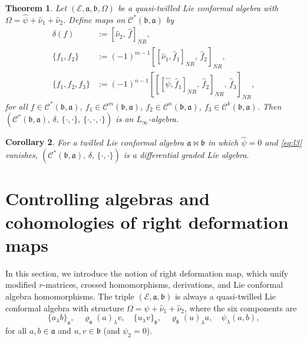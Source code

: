 \documentclass[a4paper,11pt]{article}
\def\Ep{\mathcal{E}}
\def\Vs{\mathfrak{a}}
\def\Ws{\mathfrak{b}}
\def\rep{\varrho}
\def\str{\Omega}
\def\smu{\widehat{\nu}_1}
\def\smv{\widehat{\nu}_2}
\def\shf{\widehat{\psi}}
\def\Cch{\mathscr{C}}
\def\la{\lambda}
\numberwithin{equation}{section}
\newtheorem{theorem}{Theorem}[section]
\newtheorem{corollary}[theorem]{Corollary}
\begin{document}
\begin{theorem}\label{thm:Linf-quasi}
  Let $(\Ep,\Vs,\Ws,\str)$ be a quasi-twilled Lie conformal  algebra
  with $\str = \shf+\smu+\smv$.  Define maps on $\Cch^*(\Ws,\Vs)$ by
  \begin{align}
    \delta(f)
    &:= [\smv,\,\widehat f]_{NR}, \label{eq:l1}\\
    \{f_1,f_2\}
    &:= (-1)^{m-1}[[\smu,\widehat f_1]_{NR},\,\widehat f_2]_{NR},
    \label{eq:l2}\\
    \{f_1,f_2,f_3\}
    &:= (-1)^{n-1}[[[\shf,\widehat f_1]_{NR},\,\widehat f_2]_{NR},
       \,\widehat f_3]_{NR},\label{eq:l3}
  \end{align}
  for all $f\in\Cch^*(\Ws,\Vs)$, $f_1\in\Cch^m(\Ws,\Vs)$,
  $f_2\in\Cch^n(\Ws,\Vs)$, $f_3\in\Cch^k(\Ws,\Vs)$.  Then
  $(\Cch^*(\Ws,\Vs),\,\delta,\,\{\cdot,\cdot\},\,\{\cdot,\cdot,\cdot\})$
  is an $L_\infty$-algebra.
\end{theorem}

\begin{corollary}\label{cor:dgla-twilled}
  For a twilled Lie conformal  algebra $\Vs\bowtie\Ws$
   in which $\shf=0$ and \eqref{eq:l3} vanishes,
  $(\Cch^*(\Ws,\Vs),\,\delta,\,\{\cdot,\cdot\})$ is a differential
  graded Lie algebra.
\end{corollary}


\section{Controlling algebras and cohomologies of right deformation maps}
\label{sec:typeI}
 
In this section, we introduce the notion of right deformation map, which unify
 modified $r$-matrices,  crossed homomorphisms,
 derivations, and  Lie conformal algebra homomorphisms. The triple 
$(\Ep,\Vs,\Ws)$ is always a quasi-twilled Lie conformal algebra with structure $\str=\shf+\smu+\smv$, where the six components are
\[
  \{a_\la b\}_\Vs,\quad
  \rep_\Vs(a)_\la v,\quad
  \{u_\la v\}_\Ws,\quad
  \rep_\Ws(u)_\la a,\quad
  \psi_{\la}(a,b),
\]
for all $a,b\in\Vs$ and $u,v\in\Ws$ (and $\psi_2=0$).
 
\end{document}
